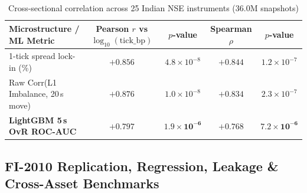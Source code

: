 \documentclass[12pt,a4paper,oneside]{report}
\begin{document}
\begin{table}[H]
\centering\scriptsize
\caption{Cross-sectional correlation across 25 Indian NSE instruments (36.0M snapshots)}
\label{tab:u25_corr}
\begin{tabular}{@{}lcccc@{}}
\toprule
\textbf{Microstructure / ML Metric} & \textbf{Pearson $r$ vs $\log_{10}(\text{tick\_bp})$} & \textbf{$p$-value} & \textbf{Spearman $\rho$} & \textbf{$p$-value} \\
\midrule
1-tick spread lock-in (\%) & $+0.856$ & $4.8 \times 10^{-8}$ & $+0.844$ & $1.2 \times 10^{-7}$ \\
Raw Corr(L1 Imbalance, 20\,s move) & $+0.876$ & $1.0 \times 10^{-8}$ & $+0.834$ & $2.3 \times 10^{-7}$ \\
\textbf{LightGBM 5\,s OvR ROC-AUC} & $\mathbf{+0.797}$ & $\mathbf{1.9 \times 10^{-6}}$ & $\mathbf{+0.768}$ & $\mathbf{7.2 \times 10^{-6}}$ \\
\bottomrule
\end{tabular}
\end{table}

\subsection{FI-2010 Replication, Regression, Leakage \& Cross-Asset Benchmarks}
\end{document}
